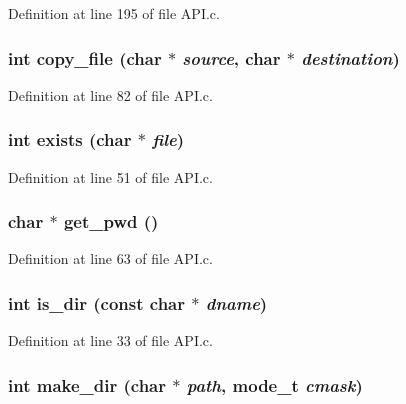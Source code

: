 Definition at line 195 of file API.c.

\subsubsection[{copy\_\-file}]{\setlength{\rightskip}{0pt plus 5cm}int copy\_\-file (char $\ast$ {\em source}, \/  char $\ast$ {\em destination})}\label{_a_p_i_8c_a5d39161534e225e63e2b654d3216e38c}


Definition at line 82 of file API.c.

\subsubsection[{exists}]{\setlength{\rightskip}{0pt plus 5cm}int exists (char $\ast$ {\em file})}\label{_a_p_i_8c_a436bca6fd78f0ec6e0b6a304affe17e6}


Definition at line 51 of file API.c.

\subsubsection[{get\_\-pwd}]{\setlength{\rightskip}{0pt plus 5cm}char $\ast$ get\_\-pwd ()}\label{_a_p_i_8c_aab4b44d56247a5295c2cbce4c311f9ba}


Definition at line 63 of file API.c.

\subsubsection[{is\_\-dir}]{\setlength{\rightskip}{0pt plus 5cm}int is\_\-dir (const char $\ast$ {\em dname})}\label{_a_p_i_8c_a7791f3db8a56d9f73ddbd1a774023873}


Definition at line 33 of file API.c.

\subsubsection[{make\_\-dir}]{\setlength{\rightskip}{0pt plus 5cm}int make\_\-dir (char $\ast$ {\em path}, \/  mode\_\-t {\em cmask})}\label{_a_p_i_8c_a0462ccb9c57862690cefe3f130234f10}


